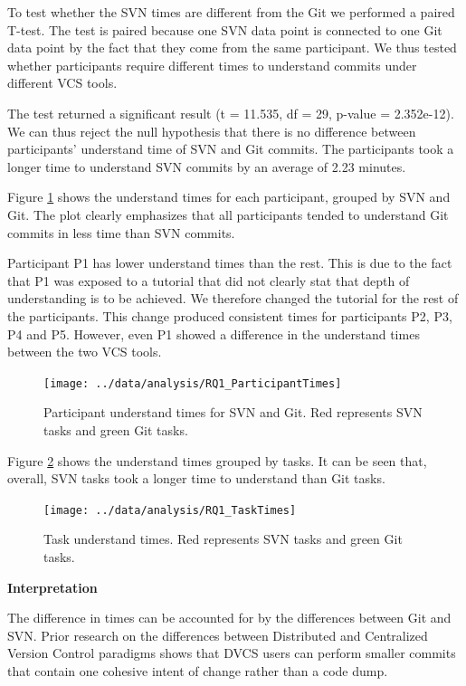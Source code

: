 \documentclass[letterpaper]{article}
\begin{document}
To test whether the SVN times are different from the Git we performed a paired T-test.
The test is paired because one SVN data point is connected to one Git data point by the fact that they come from the same participant.
We thus tested whether participants require different times to understand commits under different VCS tools.

The test returned a significant result (t = 11.535, df = 29, p-value = 2.352e-12). 
We can thus reject the null hypothesis that there is no difference between participants' understand time of SVN and Git commits.
The participants took a longer time to understand SVN commits by an average of 2.23 minutes.

Figure \ref{fig:rq1-participantTimes} shows the understand times for each participant, grouped by SVN and Git.
The plot clearly emphasizes that all participants tended to understand Git commits in less time than SVN commits.

Participant P1 has lower understand times than the rest.
This is due to the fact that P1 was exposed to a tutorial that did not clearly stat that depth of understanding is to be achieved.
We therefore changed the tutorial for the rest of the participants.
This change produced consistent times for participants P2, P3, P4 and P5.
However, even P1 showed a difference in the understand times between the two VCS tools.

\begin{figure}[H]
    \centering
    \texttt{[image: ../data/analysis/RQ1\_ParticipantTimes]}
    \caption{Participant understand times for SVN and Git. Red represents SVN tasks and green Git tasks.}
    \label{fig:rq1-participantTimes}
\end{figure}

Figure \ref{fig:rq1-taskTimes} shows the understand times grouped by tasks.
It can be seen that, overall, SVN tasks took a longer time to understand than Git tasks.

\begin{figure}[H]
    \centering
    \texttt{[image: ../data/analysis/RQ1\_TaskTimes]}
    \caption{Task understand times. Red represents SVN tasks and green Git tasks.}
    \label{fig:rq1-taskTimes}
\end{figure}


\textbf{Interpretation}

The difference in times can be accounted for by the differences between Git and SVN. 
Prior research on the differences between Distributed and Centralized Version Control paradigms shows that DVCS users can perform smaller commits that contain one cohesive intent of change rather than a code dump.
\end{document}
